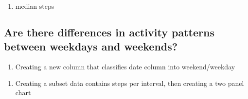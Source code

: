 \documentclass[]{article}
\newenvironment{Shaded}{\begin{snugshade}}{\end{snugshade}}
\newcommand{\KeywordTok}[1]{\textcolor[rgb]{0.13,0.29,0.53}{\textbf{#1}}}
\newcommand{\DataTypeTok}[1]{\textcolor[rgb]{0.13,0.29,0.53}{#1}}
\newcommand{\DecValTok}[1]{\textcolor[rgb]{0.00,0.00,0.81}{#1}}
\newcommand{\StringTok}[1]{\textcolor[rgb]{0.31,0.60,0.02}{#1}}
\newcommand{\OperatorTok}[1]{\textcolor[rgb]{0.81,0.36,0.00}{\textbf{#1}}}
\newcommand{\NormalTok}[1]{#1}
\providecommand{\tightlist}{%
  \setlength{\itemsep}{0pt}\setlength{\parskip}{0pt}}
\begin{document}
\begin{enumerate}
\def\labelenumi{\arabic{enumi}.}
\setcounter{enumi}{16}
\tightlist
\item
  median steps
\end{enumerate}

\begin{Shaded}
\end{Shaded}

\subsection{Are there differences in activity patterns between weekdays
and
weekends?}\label{are-there-differences-in-activity-patterns-between-weekdays-and-weekends}

\begin{enumerate}
\def\labelenumi{\arabic{enumi}.}
\setcounter{enumi}{17}
\tightlist
\item
  Creating a new column that classifies date column into weekend/weekday
\end{enumerate}

\begin{Shaded}
\end{Shaded}

\begin{enumerate}
\def\labelenumi{\arabic{enumi}.}
\setcounter{enumi}{18}
\tightlist
\item
  Creating a subset data contains steps per interval, then creating a
  two panel chart
\end{enumerate}
\end{document}
